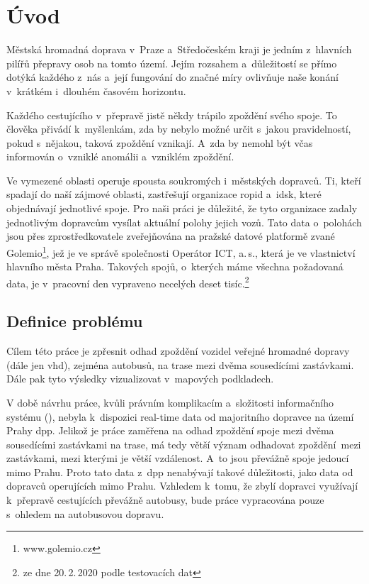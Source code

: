 \chapter*{Úvod}

Městská hromadná doprava v~Praze a~Středočeském kraji je jedním z~hlavních pilířů přepravy osob na tomto území. Jejím rozsahem a~důležitostí se přímo dotýká každého z~nás a~její fungování do značné míry ovlivňuje naše konání v~krátkém i~dlouhém časovém horizontu.

\bigbreak

Každého cestujícího v~přepravě jistě někdy trápilo zpoždění svého spoje. To člověka přivádí k~myšlenkám, zda by nebylo možné určit s~jakou pravidelností, pokud s~nějakou, taková zpoždění vznikají. A~zda by nemohl být včas informován o~vzniklé anomálii a~vzniklém zpoždění.

\bigbreak

Ve vymezené oblasti operuje spousta soukromých i~městských dopravců. Ti, kteří spadají do naší zájmové oblasti, zastřešují organizace \gls{ropid} a~\gls{idsk}, které objednávají jednotlivé spoje. Pro naši práci je důležité, že tyto organizace zadaly jednotlivým dopravcům vysílat aktuální polohy jejich vozů. Tato data o~polohách jsou přes zprostředkovatele zveřejňována na pražské datové platformě zvané Golemio\footnote{www.golemio.cz}, jež je ve správě společnosti Operátor ICT, a.\,s., která je ve vlastnictví hlavního města Praha. Takových spojů, o~kterých máme všechna požadovaná data, je v~pracovní den vypraveno necelých deset tisíc.\footnote{ze dne 20.\,2.\,2020 podle testovacích dat}

\section*{Definice problému}

Cílem této práce je zpřesnit odhad zpoždění vozidel veřejné hromadné dopravy (dále jen \gls{vhd}), zejména autobusů, na trase mezi dvěma sousedícími zastávkami. Dále pak tyto výsledky vizualizovat v~mapových podkladech.


\bigbreak

V době návrhu práce, kvůli právním komplikacím a~složitosti informačního systému (\citet{Gurycova19}), nebyla k~dispozici real-time data od majoritního dopravce na území Prahy \gls{dpp}. Jelikož je práce zaměřena na odhad zpoždění spoje mezi dvěma sousedícími zastávkami na trase, má tedy větší význam odhadovat zpoždění mezi zastávkami, mezi kterými je větší vzdálenost. A~to jsou převážně spoje jedoucí mimo Prahu. Proto tato data z~\gls{dpp} nenabývají takové důležitosti, jako data od dopravců operujících mimo Prahu. Vzhledem k~tomu, že zbylí dopravci využívají k~přepravě cestujících převážně autobusy, bude práce vypracována pouze s~ohledem na autobusovou dopravu.

